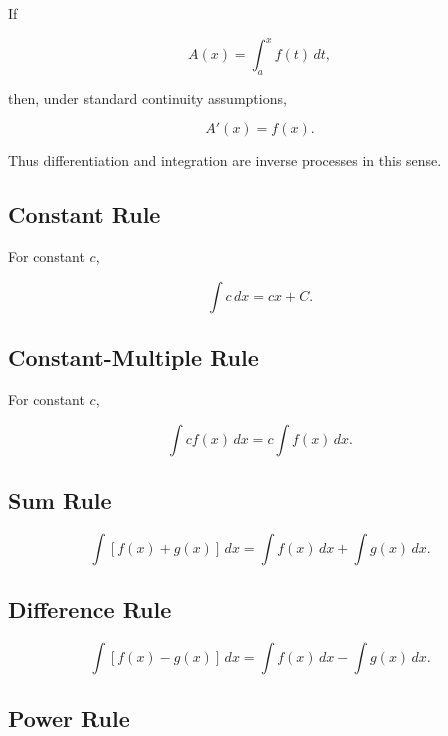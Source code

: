 If

\[
A(x)
=
\int_a^x f(t)\,dt,
\]

then, under standard continuity assumptions,

\[
\boxed{
A'(x)=f(x).
}
\]

Thus differentiation and integration are inverse processes in this sense.

\subsection{Constant Rule}
\label{subsec:constant-integral-rule}

For constant \(c\),

\[
\boxed{
\int c\,dx
=
cx+C.
}
\]

\subsection{Constant-Multiple Rule}
\label{subsec:constant-multiple-integral-rule}

For constant \(c\),

\[
\boxed{
\int c f(x)\,dx
=
c\int f(x)\,dx.
}
\]

\subsection{Sum Rule}
\label{subsec:sum-integral-rule}

\[
\boxed{
\int
[f(x)+g(x)]
\,dx
=
\int f(x)\,dx
+
\int g(x)\,dx.
}
\]

\subsection{Difference Rule}
\label{subsec:difference-integral-rule}

\[
\boxed{
\int
[f(x)-g(x)]
\,dx
=
\int f(x)\,dx
-
\int g(x)\,dx.
}
\]

\subsection{Power Rule}
\label{subsec:power-integral-rule}

